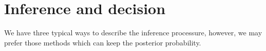 \documentclass[11pt,en,cite=authoryear]{elegantpaper}
\begin{document}
\section{Inference and decision}
We have three typical ways to describe the inference processure, however, we may prefer those methods which can keep the posterior probability.







\appendix
\addappheadtotoc
\end{document}
